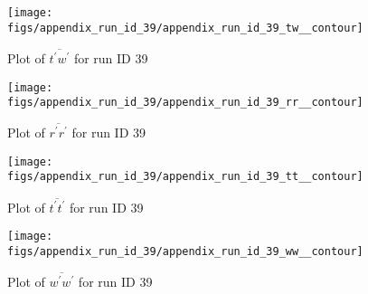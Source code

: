 \begin{figure}[H]
\centering
\texttt{[image: figs/appendix\_run\_id\_39/appendix\_run\_id\_39\_tw\_\_contour]}
\caption{Plot of $\overline{t^\prime w^\prime}$ for run ID 39}
\label{fig:appendix_run_id_39_tw__contour}
\end{figure}


\begin{figure}[H]
\centering
\texttt{[image: figs/appendix\_run\_id\_39/appendix\_run\_id\_39\_rr\_\_contour]}
\caption{Plot of $\overline{r^\prime r^\prime}$ for run ID 39}
\label{fig:appendix_run_id_39_rr__contour}
\end{figure}


\begin{figure}[H]
\centering
\texttt{[image: figs/appendix\_run\_id\_39/appendix\_run\_id\_39\_tt\_\_contour]}
\caption{Plot of $\overline{t^\prime t^\prime}$ for run ID 39}
\label{fig:appendix_run_id_39_tt__contour}
\end{figure}


\begin{figure}[H]
\centering
\texttt{[image: figs/appendix\_run\_id\_39/appendix\_run\_id\_39\_ww\_\_contour]}
\caption{Plot of $\overline{w^\prime w^\prime}$ for run ID 39}
\label{fig:appendix_run_id_39_ww__contour}
\end{figure}


